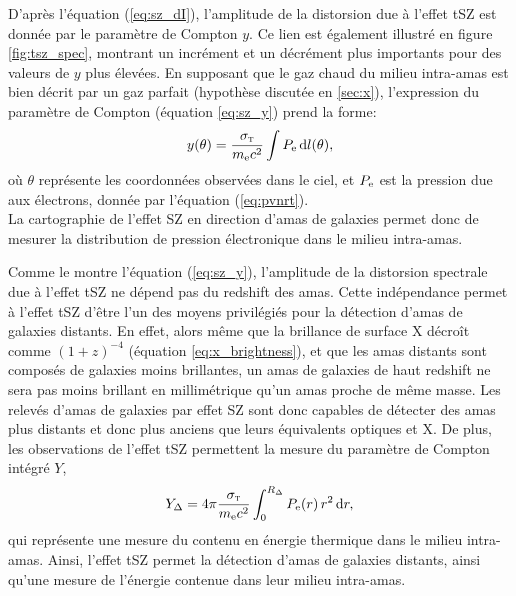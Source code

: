 D'après l'équation (\ref{eq:sz_dI}), l'amplitude de la distorsion due à l'effet tSZ est donnée par le paramètre de Compton $y$.
Ce lien est également illustré en figure \ref{fig:tsz_spec}, montrant un incrément et un décrément plus importants pour des valeurs de $y$ plus élevées.
En supposant que le gaz chaud du milieu intra-amas est bien décrit par un gaz parfait (hypothèse discutée en \ref{sec:x}), l'expression du paramètre de Compton (équation \ref{eq:sz_y}) prend la forme:
\begin{equation}
    \label{}
    y(\theta) = \frac{\sigma_\textsc{t}}{m_{\rm e} c^2} \int P_{\rm e} \, \mathrm{d} l(\theta),
\end{equation}
où $\theta$ représente les coordonnées observées dans le ciel, et $P_{\rm e}$ est la pression due aux électrons, donnée par l'équation (\ref{eq:pvnrt}). \\
La cartographie de l'effet SZ en direction d'amas de galaxies permet donc de mesurer la distribution de pression électronique dans le milieu intra-amas.

Comme le montre l'équation (\ref{eq:sz_y}), l'amplitude de la distorsion spectrale due à l'effet tSZ ne dépend pas du redshift des amas.
Cette indépendance permet à l'effet tSZ d'être l'un des moyens privilégiés pour la détection d'amas de galaxies distants.
En effet, alors même que la brillance de surface X décroît comme $(1+z)^{-4}$ (équation \ref{eq:x_brightness}), et que les amas distants sont composés de galaxies moins brillantes, un amas de galaxies de haut redshift ne sera pas moins brillant en millimétrique qu'un amas proche de même masse.
Les relevés d'amas de galaxies par effet SZ sont donc capables de détecter des amas plus distants et donc plus anciens que leurs équivalents optiques et X.
De plus, les observations de l'effet tSZ permettent la mesure du paramètre de Compton intégré $Y$,
\begin{equation}
    \label{eq:sz_yinteg}
    Y_\Delta = 4\pi\frac{\sigma_\textsc{t}}{m_{\rm e} c^2}\int_0^{R_\Delta} P_{\rm e}(r) \, r^2 \, \mathrm{d} r,
\end{equation}
qui représente une mesure du contenu en énergie thermique dans le milieu intra-amas.
Ainsi, l'effet tSZ permet la détection d'amas de galaxies distants, ainsi qu'une mesure de l'énergie contenue dans leur milieu intra-amas.

